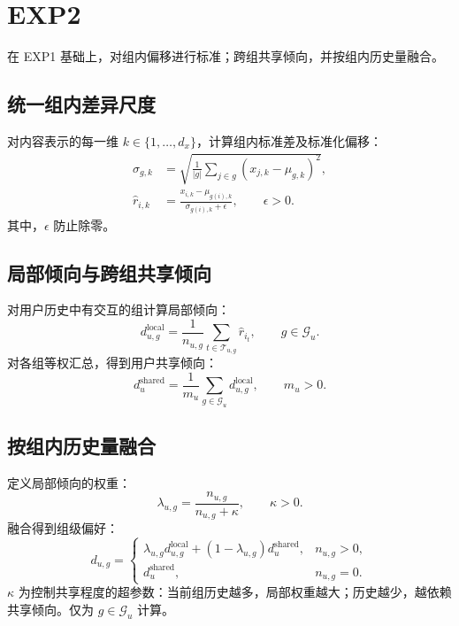 \documentclass[UTF8,11pt,a4paper]{ctexart}
\begin{document}
\section{EXP2}

在 EXP1 基础上，对组内偏移进行标准；跨组共享倾向，并按组内历史量融合。

\subsection{统一组内差异尺度}

对内容表示的每一维 $k\in\{1,\ldots,d_x\}$，计算组内标准差及标准化偏移：
\begin{align}
 \sigma_{g,k}
 &=\sqrt{\frac{1}{|g|}\sum_{j\in g}(x_{j,k}-\mu_{g,k})^2},\\
 \hat r_{i,k}
 &=\frac{x_{i,k}-\mu_{g(i),k}}{\sigma_{g(i),k}+\epsilon},
 \qquad \epsilon>0.
\end{align}
其中，$\epsilon$ 防止除零。

\subsection{局部倾向与跨组共享倾向}

对用户历史中有交互的组计算局部倾向：
\begin{equation}
 d_{u,g}^{\mathrm{local}}
 =\frac{1}{n_{u,g}}\sum_{t\in\mathcal T_{u,g}}\hat r_{i_t},
 \qquad g\in\mathcal G_u.
\end{equation}
对各组等权汇总，得到用户共享倾向：
\begin{equation}
 d_u^{\mathrm{shared}}
 =\frac{1}{m_u}\sum_{g\in\mathcal G_u}d_{u,g}^{\mathrm{local}},
 \qquad m_u>0.
\end{equation}


\subsection{按组内历史量融合}

定义局部倾向的权重：
\begin{equation}
 \lambda_{u,g}=\frac{n_{u,g}}{n_{u,g}+\kappa},\qquad \kappa>0.
\end{equation}
融合得到组级偏好：
\begin{equation}
 d_{u,g}=
 \begin{cases}
 \lambda_{u,g}d_{u,g}^{\mathrm{local}}
 +(1-\lambda_{u,g})d_u^{\mathrm{shared}}, & n_{u,g}>0,\\
 d_u^{\mathrm{shared}}, & n_{u,g}=0.
 \end{cases}
\end{equation}
$\kappa$ 为控制共享程度的超参数：当前组历史越多，局部权重越大；历史越少，越依赖共享倾向。仅为 $g\in\mathcal G_u$ 计算。
\end{document}
